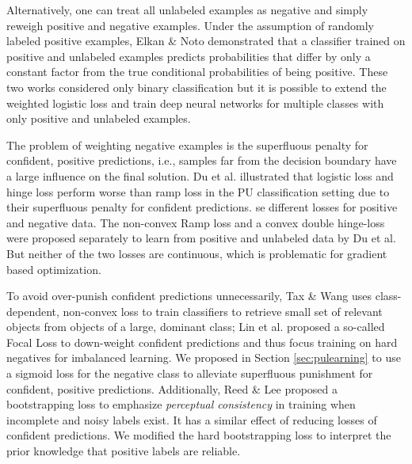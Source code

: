 Alternatively, one can treat all unlabeled examples as negative and simply reweigh positive and negative examples. \cite{lee2003learning}
Under the assumption of randomly labeled positive examples, Elkan \& Noto \cite{elkan2008learning} demonstrated that a classifier trained on positive and unlabeled examples predicts probabilities that differ by only a constant factor from the true conditional probabilities of being positive.
These two works considered only binary classification but it is possible to extend the weighted logistic loss and train deep neural networks for multiple classes with only positive and unlabeled examples.

The problem of weighting negative examples is the superfluous penalty for confident, positive predictions, i.e., samples far from the decision boundary have a large influence on the final solution. \cite{tax2016class}
Du et al. \cite{du2015convex} illustrated that logistic loss and hinge loss perform worse than ramp loss in the PU classification setting due to their superfluous penalty for confident predictions.
se different losses for positive and negative data.
The non-convex Ramp loss \cite{du2014analysis} and a convex double hinge-loss \cite{du2015convex} were proposed separately to learn from positive and unlabeled data by Du et al.
But neither of the two losses are continuous, which is problematic for gradient based optimization.

To avoid over-punish confident predictions unnecessarily, Tax \& Wang \cite{tax2016class} uses class-dependent, non-convex loss to train classifiers to retrieve small set of relevant objects from objects of a large, dominant class;
Lin et al. \cite{lin2017focal} proposed a so-called Focal Loss to down-weight confident predictions and thus focus training on hard negatives for imbalanced learning.
We proposed in Section \ref{sec:pulearning} to use a sigmoid loss\cite{tax2016class} for the negative class to alleviate superfluous punishment for confident, positive predictions.
Additionally, Reed \& Lee \cite{reed2014training} proposed a bootstrapping loss to emphasize \textit{perceptual consistency} in training when incomplete and noisy labels exist.
It has a similar effect of reducing losses of confident predictions.
We modified the hard bootstrapping loss to interpret the prior knowledge that positive labels are reliable.

